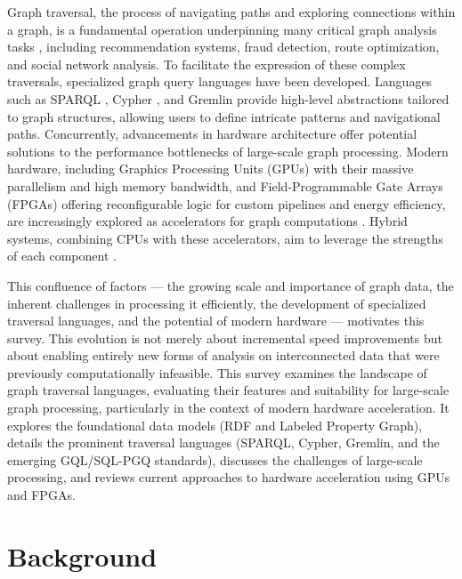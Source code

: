 \documentclass[sigconf,natbib=false]{acmart}
\begin{document}
Graph traversal, the process of navigating paths and exploring connections within a graph, is a fundamental operation underpinning many critical graph analysis tasks \cite{robinson2015GraphDatabasesNew}, including recommendation systems, fraud detection, route optimization, and social network analysis. %
To facilitate the expression of these complex traversals, specialized graph query languages have been developed.
Languages such as SPARQL \cite{SPARQL11Query}, Cypher \cite{IntroductionCypherManual}, and Gremlin \cite{ApacheTinkerPopGremlin} provide high-level abstractions tailored to graph structures, allowing users to define intricate patterns and navigational paths.
Concurrently, advancements in hardware architecture offer potential solutions to the performance bottlenecks of large-scale graph processing.
Modern hardware, including Graphics Processing Units (GPUs) with their massive parallelism and high memory bandwidth, and Field-Programmable Gate Arrays (FPGAs) offering reconfigurable logic for custom pipelines and energy efficiency, are increasingly explored as accelerators for graph computations \cite{barghiBitGraphFrameworkScaling, besta2019GraphProcessingFPGAs}.
Hybrid systems, combining CPUs with these accelerators, aim to leverage the strengths of each component \cite{gharaibehEfficientLargeScaleGraph}.

This confluence of factors --- the growing scale and importance of graph data, the inherent challenges in processing it efficiently, the development of specialized traversal languages, and the potential of modern hardware --- motivates this survey. This evolution is not merely about incremental speed improvements but about enabling entirely new forms of analysis on interconnected data that were previously computationally infeasible. This survey examines the landscape of graph traversal languages, evaluating their features and suitability for large-scale graph processing, particularly in the context of modern hardware acceleration. It explores the foundational data models (RDF and Labeled Property Graph), details the prominent traversal languages (SPARQL, Cypher, Gremlin, and the emerging GQL/SQL-PGQ standards), discusses the challenges of large-scale processing, and reviews current approaches to hardware acceleration using GPUs and FPGAs.

\section{Background}
\end{document}
